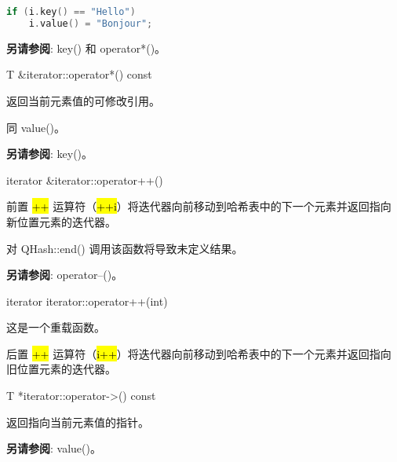 \begin{lstlisting}[language=C++]
if (i.key() == "Hello")
    i.value() = "Bonjour";
\end{lstlisting}

\textbf{另请参阅}: key() 和 operator*()。

T \&iterator::operator*() const

返回当前元素值的可修改引用。

同 value()。

\textbf{另请参阅}: key()。

iterator \&iterator::operator++()

前置 \hl{++} 运算符（\hl{++i}）将迭代器向前移动到哈希表中的下一个元素并返回指向新位置元素的迭代器。

对 QHash::end() 调用该函数将导致未定义结果。

\textbf{另请参阅}: operator--()。

iterator iterator::operator++(int)

这是一个重载函数。

后置 \hl{++} 运算符（\hl{i++}）将迭代器向前移动到哈希表中的下一个元素并返回指向旧位置元素的迭代器。

T *iterator::operator->() const

返回指向当前元素值的指针。

\textbf{另请参阅}: value()。

